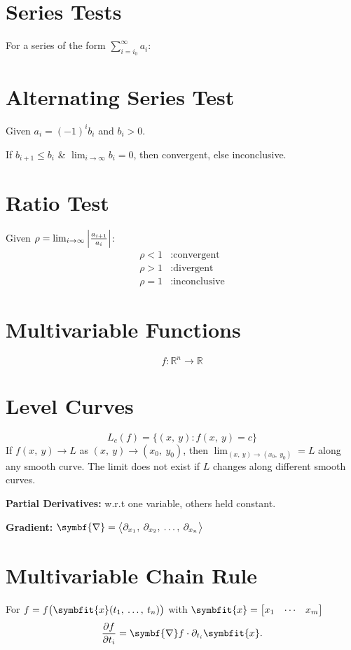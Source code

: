\documentclass{article}
\begin{document}
\begin{multicols}{3}
    \section*{Series Tests}
    For a series of the form \(\displaystyle\sum_{i=i_0}^\infty a_i\):
    \section*{Alternating Series Test}
    Given \(a_i = \left( -1 \right)^i b_i\) and \(b_i>0\).

    If \(b_{i+1}\leqslant b_i\) \& \(\lim_{i\to\infty}b_i=0\), then
    convergent, else inconclusive.
    \section*{Ratio Test}
    Given \(\rho = \lim_{i\to\infty}\abs{\frac{a_{i+1}}{a_i}}\):
    \begin{align*}
        \rho < 1 & : \text{convergent}   \\
        \rho > 1 & : \text{divergent}    \\
        \rho = 1 & : \text{inconclusive}
    \end{align*}
    \section*{Multivariable Functions}
    \begin{equation*}
        f:\mathbb{R}^n\to\mathbb{R}
    \end{equation*}
    \section*{Level Curves}
    \begin{equation*}
        L_c\left( f \right) = \bigl\{ \left( x,\: y \right) : f\left(x,\: y\right) = c\bigr\}
    \end{equation*}
    If \(f(x,\: y) \to L\) as \((x,\: y) \to (x_0,\: y_0)\), then
    \(\displaystyle \lim_{(x,\: y) \to (x_0,\: y_0)} = L\) along any smooth
    curve. The limit does not exist if \(L\) changes along different smooth curves.

    \textbf{Partial Derivatives:} w.r.t one variable, others held constant.

    \textbf{Gradient:} \(\symbf{\nabla} = \avec[\big]{\partial_{x_1},\: \partial_{x_2},\: \dots,\: \partial_{x_n}}\)
    \section*{Multivariable Chain Rule}
    For \(f=f\bigl(\symbfit{x}(t_1,\: \ldots,\: t_n)\bigr)\) with
    \(\symbfit{x}=\mqty[x_1 & \cdots & x_m]\)
    \begin{equation*}
        \pdv{f}{t_i} = \symbf{\nabla}f \cdot \partial_{t_i}\symbfit{x}.
    \end{equation*}

\end{multicols}
\end{document}
